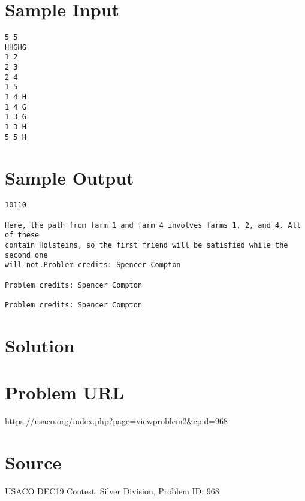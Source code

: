 \documentclass[12pt]{article}
\begin{document}
\section*{Sample Input}
\begin{verbatim}
5 5
HHGHG
1 2
2 3
2 4
1 5
1 4 H
1 4 G
1 3 G
1 3 H
5 5 H
\end{verbatim}

\section*{Sample Output}
\begin{verbatim}
10110

Here, the path from farm 1 and farm 4 involves farms 1, 2, and 4. All of these
contain Holsteins, so the first friend will be satisfied while the second one
will not.Problem credits: Spencer Compton

Problem credits: Spencer Compton

Problem credits: Spencer Compton
\end{verbatim}

\section*{Solution}


\section*{Problem URL}
https://usaco.org/index.php?page=viewproblem2&cpid=968

\section*{Source}
USACO DEC19 Contest, Silver Division, Problem ID: 968
\end{document}
